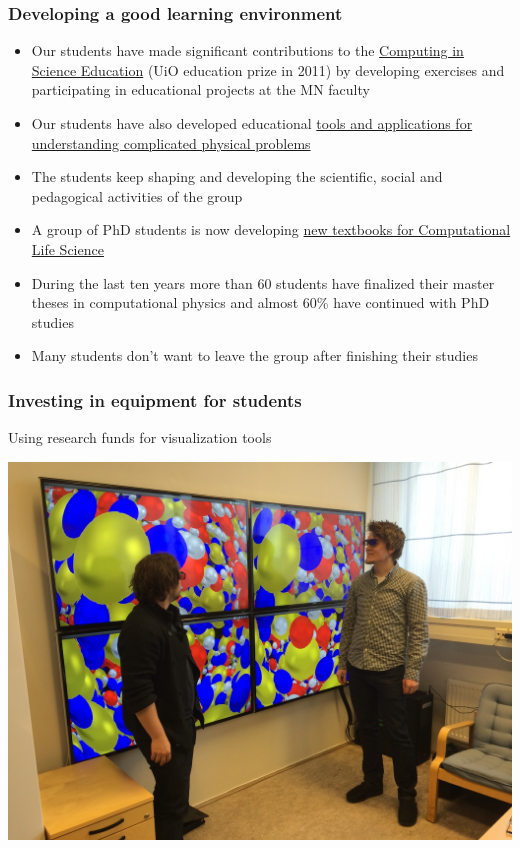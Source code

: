 \documentclass{beamer}
\begin{document}
\begin{frame}
\frametitle{Developing a good learning environment}

\begin{block}{}
\begin{itemize}
\item Our students have made significant contributions to  the \href{{http://www.mn.uio.no/english/about/collaboration/cse/}}{Computing in Science Education}  (UiO education prize in 2011) by developing exercises and participating in educational projects at the MN faculty

\item Our students have also developed educational \href{{http://www.mn.uio.no/fysikk/om/aktuelt/aktuelle-saker/2015/realfagsapper.html}}{tools and applications for understanding complicated physical problems} 

\item The students keep shaping and developing the scientific, social and pedagogical activities of the group

\item A group of PhD students is now developing \href{{https://github.com/CINPLA/ibvcse}}{new textbooks for Computational Life Science}

\item During the last ten years more than 60 students have finalized their master theses in computational physics and  almost 60\% have continued with PhD studies

\item Many students don't want to leave the group after finishing their studies
\end{itemize}

\noindent
\end{block}
\end{frame}

\begin{frame}
\frametitle{Investing in equipment for students}

\begin{block}{Using research funds for visualization tools }


\centerline{\includegraphics[width=0.7\linewidth]{fig-future/visualize.jpg}}



\end{block}
\end{frame}
\end{document}
